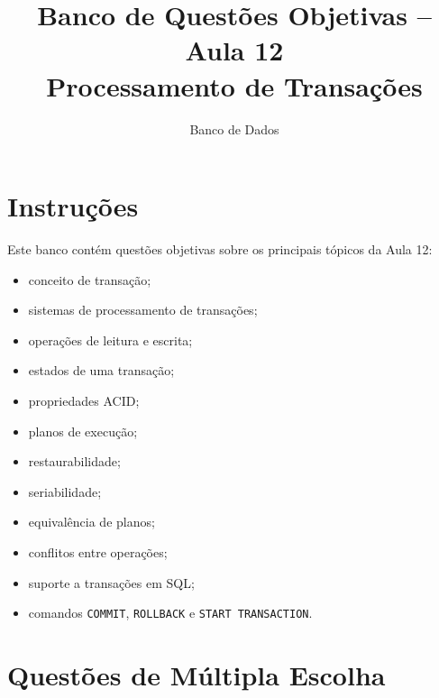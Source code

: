 \documentclass[12pt,a4paper]{article}
\title{Banco de Questões Objetivas -- Aula 12\\Processamento de Transações}
\author{Banco de Dados}
\date{}
\begin{document}
\maketitle

\section*{Instruções}

Este banco contém questões objetivas sobre os principais tópicos da Aula 12:
\begin{itemize}
    \item conceito de transação;
    \item sistemas de processamento de transações;
    \item operações de leitura e escrita;
    \item estados de uma transação;
    \item propriedades ACID;
    \item planos de execução;
    \item restaurabilidade;
    \item seriabilidade;
    \item equivalência de planos;
    \item conflitos entre operações;
    \item suporte a transações em SQL;
    \item comandos \texttt{COMMIT}, \texttt{ROLLBACK} e \texttt{START TRANSACTION}.
\end{itemize}

\section{Questões de Múltipla Escolha}
\end{document}

